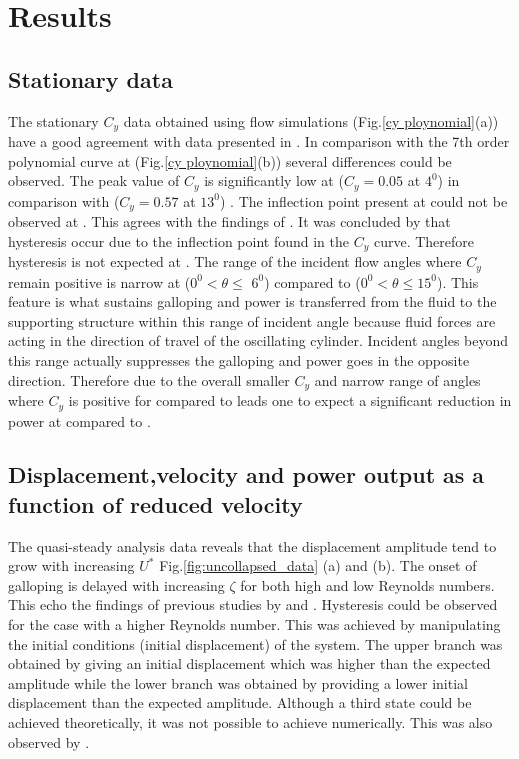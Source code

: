 \section{Results}

\subsection{Stationary data}

The stationary $C_y$ data obtained using flow simulations (Fig.\ref{cy ploynomial}(a)) have a good agreement with data presented in \cite{Joly2012}. In comparison with the 7th order polynomial curve at  (Fig.\ref{cy ploynomial}(b))  several differences could be observed. The peak value of $C_y$ is  significantly low at  ($C_y=0.05$ at $4^0$) in comparison with  ($C_y=0.57$ at $13^0$) . The inflection point present at  could not be observed at . This agrees with the findings of \cite{Luo2003}. It was concluded by \cite{Luo2003} that hysteresis occur due to the inflection point found in the $C_y$ curve. Therefore hysteresis is not expected at . The range of the incident flow angles where $C_y$ remain positive is narrow at  ($0^0 <\theta \leq$ $6^0$) compared to  ($0^0 <\theta \leq 15^0$). This feature is what sustains galloping and power is transferred from the fluid to the supporting structure within this range of incident angle because fluid forces are acting in the direction of travel of the oscillating cylinder. Incident angles beyond this range actually suppresses the galloping and power goes in the opposite direction. Therefore due to the overall smaller $C_y$ and narrow range of angles where $C_y$ is positive for  compared to  leads one to expect a significant reduction in power at compared to .

  



\subsection{Displacement,velocity and power output as a function of reduced velocity}


 The quasi-steady analysis data reveals that the displacement amplitude tend to grow with increasing $U^*$ Fig.\ref{fig:uncollapsed_data} (a) and (b). The onset of galloping is delayed with increasing $\zeta$ for both high and low Reynolds numbers. This echo the findings of previous studies by \cite{Parkinson1964} and \cite{Barrero-Gil2010a}. Hysteresis could be observed for the case with a higher Reynolds number. This was achieved by manipulating the initial conditions (initial displacement) of the system. The upper branch was obtained by giving an initial displacement which was higher than the expected amplitude while the lower branch was obtained by providing a lower initial displacement than the expected amplitude. Although a third state could be achieved theoretically, it was not possible to achieve numerically. This was also observed by \cite{Vio2007}.   

